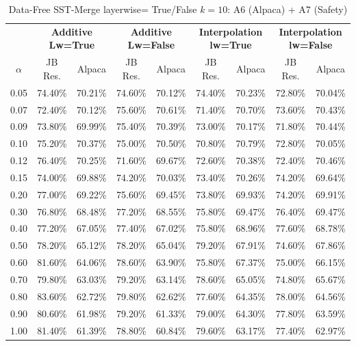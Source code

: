 \begin{table}[h]
\centering
\caption{Data-Free SST-Merge layerwise= True/False $k=10$: A6 (Alpaca) + A7 (Safety)}
\label{tab:res_a6_a7_data_free_sst_10}
\begin{tabular}{c|cc|cc|cc|cc}
\hline
 & \multicolumn{2}{c|}{\textbf{Additive Lw=True}} & \multicolumn{2}{c|}{\textbf{Additive Lw=False}} & \multicolumn{2}{c|}{\textbf{Interpolation lw=True}}& \multicolumn{2}{c}{\textbf{Interpolation lw=False}} \\
$\alpha$ & JB Res. & Alpaca & JB Res. & Alpaca & JB Res. & Alpaca & JB Res. & Alpaca \\
\hline
0.05 & 74.40\% & 70.21\% & 74.60\% & 70.12\% & 74.40\% & 70.23\% & 72.80\% & 70.04\% \\
0.07 & 72.40\% & 70.12\% & 75.60\% & 70.61\% & 71.40\% & 70.70\% & 73.60\% & 70.43\% \\
0.09 & 73.80\% & 69.99\% & 75.40\% & 70.39\% & 73.00\% & 70.17\% & 71.80\% & 70.44\% \\
0.10 & 75.20\% & 70.37\% & 75.00\% & 70.50\% & 70.80\% & 70.79\% & 72.80\% & 70.05\% \\
0.12 & 76.40\% & 70.25\% & 71.60\% & 69.67\% & 72.60\% & 70.38\% & 72.40\% & 70.46\% \\
0.15 & 74.00\% & 69.88\% & 74.20\% & 70.03\% & 73.40\% & 70.26\% & 74.20\% & 69.64\% \\
0.20 & 77.00\% & 69.22\% & 75.60\% & 69.45\% & 73.80\% & 69.93\% & 74.20\% & 69.91\% \\
0.30 & 76.80\% & 68.48\% & 77.20\% & 68.55\% & 75.80\% & 69.47\% & 76.40\% & 69.47\% \\
0.40 & 77.20\% & 67.05\% & 77.40\% & 67.02\% & 75.80\% & 68.96\% & 77.60\% & 68.78\% \\
0.50 & 78.20\% & 65.12\% & 78.20\% & 65.04\% & 79.20\% & 67.91\% & 74.60\% & 67.86\% \\
0.60 & 81.60\% & 64.06\% & 78.60\% & 63.90\% & 75.80\% & 67.37\% & 75.00\% & 66.15\% \\
0.70 & 79.80\% & 63.03\% & 79.20\% & 63.14\% & 78.60\% & 65.05\% & 74.80\% & 65.67\% \\
0.80 & 83.60\% & 62.72\% & 79.80\% & 62.62\% & 77.60\% & 64.35\% & 78.00\% & 64.56\% \\
0.90 & 80.60\% & 61.98\% & 79.20\% & 61.33\% & 79.00\% & 64.30\% & 77.80\% & 63.59\% \\
1.00 & 81.40\% & 61.39\% & 78.80\% & 60.84\% & 79.60\% & 63.17\% & 77.40\% & 62.97\% \\
\hline
\end{tabular}
\end{table}
\FloatBarrier

